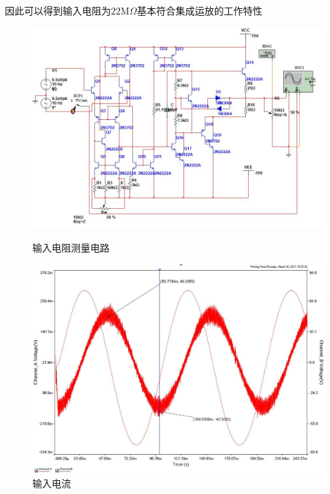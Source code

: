 \documentclass[UTF8,a4paper]{ctexart}
\begin{document}
因此可以得到输入电阻为$22\mathrm{M}\Omega$基本符合集成运放的工作特性
\begin{figure}
\centering
\includegraphics[width=\textwidth]{3-4Ri.jpg}
\caption{输入电阻测量电路}
\label{CRi}
\includegraphics[width=\textwidth]{3-4Rbi.jpg}
\caption{输入电流}
\label{BRI}
\end{figure}
\end{document}
